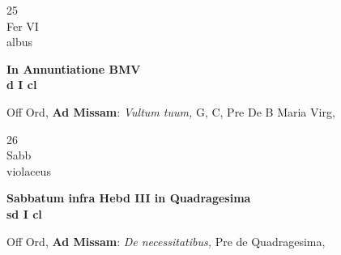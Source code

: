 \documentclass[10pt, openany]{book}
\begin{document}
        \begin{center}
            \begin{minipage}{3.5in}
                \vspace{2em}
                \begin{minipage}{0.5in}
                    {\Huge 25} \\
                    {\normalsize Fer VI} \\
                    {\normalsize albus}
                \end{minipage}
                \begin{minipage}{3.0in}
                    \textbf{ \large In Annuntiatione BMV \\
                    \textnormal{\normalsize d I cl}} \\ 
                \end{minipage}
                \begin{justify}Off Ord, \textbf{Ad Missam}: \textit{Vultum tuum,} G, C, Pre De B Maria Virg,   
                \end{justify}
            \end{minipage}
        \end{center}
    
        \begin{center}
            \begin{minipage}{3.5in}
                \vspace{2em}
                \begin{minipage}{0.5in}
                    {\Huge 26} \\
                    {\normalsize Sabb} \\
                    {\normalsize violaceus}
                \end{minipage}
                \begin{minipage}{3.0in}
                    \textbf{ \large Sabbatum infra Hebd III in Quadragesima \\
                    \textnormal{\normalsize sd I cl}} \\ 
                \end{minipage}
                \begin{justify}Off Ord, \textbf{Ad Missam}: \textit{De necessitatibus,} Pre de Quadragesima,   
                \end{justify}
            \end{minipage}
        \end{center}
    
\end{document}
